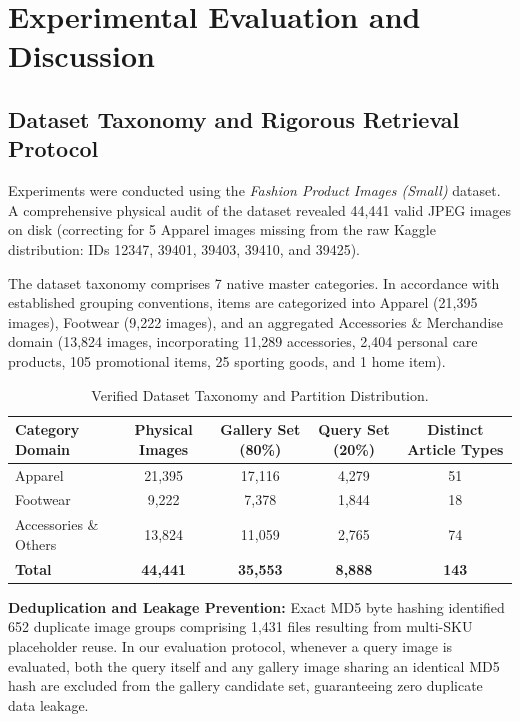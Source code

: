 \documentclass[runningheads]{llncs}
\begin{document}
\section{Experimental Evaluation and Discussion}

\subsection{Dataset Taxonomy and Rigorous Retrieval Protocol}
Experiments were conducted using the \textit{Fashion Product Images (Small)} dataset. A comprehensive physical audit of the dataset revealed 44,441 valid JPEG images on disk (correcting for 5 Apparel images missing from the raw Kaggle distribution: IDs 12347, 39401, 39403, 39410, and 39425). 

The dataset taxonomy comprises 7 native master categories. In accordance with established grouping conventions, items are categorized into Apparel (21,395 images), Footwear (9,222 images), and an aggregated Accessories \& Merchandise domain (13,824 images, incorporating 11,289 accessories, 2,404 personal care products, 105 promotional items, 25 sporting goods, and 1 home item).

\begin{table}[t]
\centering
\caption{Verified Dataset Taxonomy and Partition Distribution.}
\label{tab:dataset}
\begin{tabular}{lcccc}
\toprule
\textbf{Category Domain} & \textbf{Physical Images} & \textbf{Gallery Set (80\%)} & \textbf{Query Set (20\%)} & \textbf{Distinct Article Types} \\
\midrule
Apparel                  & 21,395                   & 17,116                      & 4,279                     & 51 \\
Footwear                 & 9,222                    & 7,378                       & 1,844                     & 18 \\
Accessories \& Others    & 13,824                   & 11,059                      & 2,765                     & 74 \\
\midrule
\textbf{Total}           & \textbf{44,441}          & \textbf{35,553}             & \textbf{8,888}            & \textbf{143} \\
\bottomrule
\end{tabular}
\end{table}

\noindent\textbf{Deduplication and Leakage Prevention:} Exact MD5 byte hashing identified 652 duplicate image groups comprising 1,431 files resulting from multi-SKU placeholder reuse. In our evaluation protocol, whenever a query image is evaluated, both the query itself and any gallery image sharing an identical MD5 hash are excluded from the gallery candidate set, guaranteeing zero duplicate data leakage.
\end{document}
